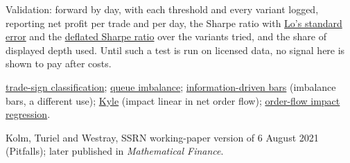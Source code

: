 \begin{qfdefinition}
Validation: forward by day, with each threshold and every variant logged, reporting net profit per trade and per day, the Sharpe ratio with \hyperref[meth:sharpe-ratio-standard-error]{Lo's standard error} and the \hyperref[meth:deflated-sharpe-ratio]{deflated Sharpe ratio} over the variants tried, and the share of displayed depth used. Until such a test is run on licensed data, no signal here is shown to pay after costs.

 \hyperref[meth:trade-sign-classification]{trade-sign classification}; \hyperref[def:queue-imbalance]{queue imbalance}; \hyperref[meth:information-driven-bars]{information-driven bars} (imbalance bars, a different use); \hyperref[mod:kyle-single-auction]{Kyle} (impact linear in net order flow); \hyperref[meth:order-flow-impact-regression]{order-flow impact regression}.

 Kolm, Turiel and Westray, SSRN working-paper version of 6 August 2021 (Pitfalls); later published in \emph{Mathematical Finance}.

\end{qfdefinition}
